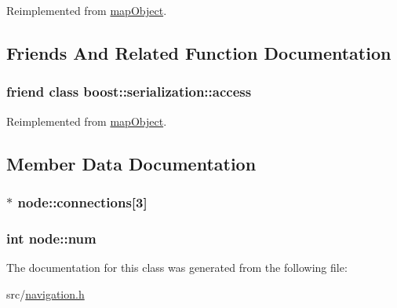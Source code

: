 \-Reimplemented from \hyperlink{classmapObject_aa6f5d2f9cb7ed87820ae7629aed1d518}{map\-Object}.



\subsection{\-Friends \-And \-Related \-Function \-Documentation}
\hypertarget{classnode_ac98d07dd8f7b70e16ccb9a01abf56b9c}{
\subsubsection[{boost\-::serialization\-::access}]{\setlength{\rightskip}{0pt plus 5cm}friend class boost\-::serialization\-::access}}\label{classnode_ac98d07dd8f7b70e16ccb9a01abf56b9c}


\-Reimplemented from \hyperlink{classmapObject_ac98d07dd8f7b70e16ccb9a01abf56b9c}{map\-Object}.



\subsection{\-Member \-Data \-Documentation}
\hypertarget{classnode_a876806ee1df6a4d08c2cc2c22aec69f2}{
\subsubsection[{connections}]{$\ast$ {\bf node\-::connections}\mbox{[}3\mbox{]}}}\label{classnode_a876806ee1df6a4d08c2cc2c22aec69f2}
\hypertarget{classnode_a7a5357a6527169c78888acf6fa2bac44}{
\subsubsection[{num}]{\setlength{\rightskip}{0pt plus 5cm}int {\bf node\-::num}}}\label{classnode_a7a5357a6527169c78888acf6fa2bac44}


\-The documentation for this class was generated from the following file\-:\begin{DoxyCompactItemize}
\item 
src/\hyperlink{navigation_8h}{navigation.\-h}\end{DoxyCompactItemize}
